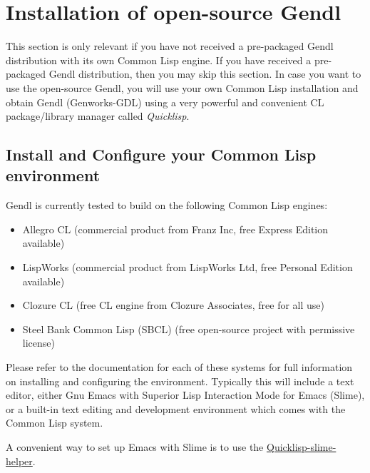\documentclass [11pt]{book}
\begin{document}
\section{Installation of open-source Gendl}

\label{sec:installationofopen-sourcegendl}

This section is only relevant if you have not received a
pre-packaged Gendl distribution with its own Common Lisp engine.  If
you have received a pre-packaged Gendl distribution, then you may skip
this section. In case you want to use the open-source Gendl, you will
use your own Common Lisp installation and obtain Gendl (Genworks-GDL)
using a very powerful and convenient CL package/library manager
called \emph{Quicklisp}.

\subsection{Install and Configure your Common Lisp environment}

\label{subsec:installandconfigureyourcommonlispenvironment}

Gendl is currently tested to build on the following Common Lisp engines:

\begin{itemize}

\item Allegro CL (commercial product from Franz Inc, free Express Edition available)

\item LispWorks (commercial product from LispWorks Ltd, free Personal Edition available)

\item Clozure CL (free CL engine from Clozure Associates, free for all use)

\item Steel Bank Common Lisp (SBCL) (free open-source project with permissive license)

\end{itemize}

Please refer to the documentation for each of these systems
for full information on installing and configuring the
environment. Typically this will include a text editor, either Gnu
Emacs with Superior Lisp Interaction Mode for Emacs (Slime), or a
built-in text editing and development environment which comes with the
Common Lisp system.

A convenient way to set up Emacs with Slime is to use the \href{http://github.com/quicklisp/quicklisp-slime-helper}{Quicklisp-slime-helper}.
\end{document}
